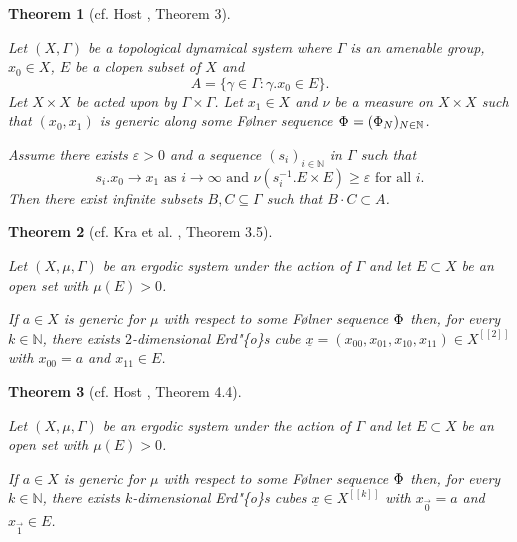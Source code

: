 \documentclass[
  british,
]{article}
\theoremstyle{definition}
\theoremstyle{plain}
\newtheorem{theorem}{Theorem}[section]
\theoremstyle{plain}
\theoremstyle{remark}
\newcommand{\AmenableGroupElement}{{\gamma}}
\newcommand{\Folner}[1][{\vphantom{}}]{{\Phi}_{#1}}
\newcommand{\N}{\mathbb{N}}
\newcommand{\GroupOperation}[2]{{#1}\cdot{#2}}
\newcommand{\AmenableGroup}{{\Gamma}}
\newcommand{\Measure}{{\mu}}
\newcommand{\GroupAction}[2]{{#1}.{#2}}
\begin{document}
\begin{theorem}[cf. Host , Theorem
3]\protect\hypertarget{thm-GenErdosConjDyn}{}\label{thm-GenErdosConjDyn}

Let \((X,\AmenableGroup)\) be a topological dynamical system where
\(\AmenableGroup\) is an amenable group, \(x_0\in X\), \(E\) be a clopen
subset of \(X\) and
\[A=\{\AmenableGroupElement\in\AmenableGroup:\GroupAction{\AmenableGroupElement}{x_0}\in E\}.\]
Let \(X\times X\) be acted upon by
\(\AmenableGroup\times\AmenableGroup\). Let \(x_1\in X\) and \(\nu\) be
a measure on \(X\times X\) such that \((x_0,x_1)\) is generic along some
Følner sequence \(\Folner=(\Folner[N])_{N\in\N}\).

Assume there exists \(\varepsilon>0\) and a sequence \((s_i)_{i\in\N}\)
in \(\AmenableGroup\) such that
\[\GroupAction{s_i}{x_0}\rightarrow x_1\text{ as }i\rightarrow\infty\text{ and }\nu(\GroupAction{s_i^{-1}}{E}\times E)\geq\varepsilon\text{ for all }i. \]
Then there exist infinite subsets \(B,C\subseteq \AmenableGroup\) such
that \(\GroupOperation{B}{C}\subset A\).

\end{theorem}

\begin{theorem}[cf. Kra et al. ,
Theorem
3.5]\protect\hypertarget{thm-GenErdosConjCube}{}\label{thm-GenErdosConjCube}

Let \((X,\Measure,\AmenableGroup)\) be an ergodic system under the
action of \(\AmenableGroup\) and let \(E\subset X\) be an open set with
\(\Measure(E)>0\).

If \(a\in X\) is generic for \(\Measure\) with respect to some Følner
sequence \(\Folner\) then, for every \(k\in\N\), there exists
\(2\)-dimensional Erd"\{o\}s cube
\(\underline{x}=(x_{00},x_{01},x_{10},x_{11})\in X^{[[2]]}\) with
\(x_{00}=a\) and \(x_{11}\in E\).

\end{theorem}

\begin{theorem}[cf. Host , Theorem
4.4]\protect\hypertarget{thm-GenNErdosConjCube}{}\label{thm-GenNErdosConjCube}

Let \((X,\Measure,\AmenableGroup)\) be an ergodic system under the
action of \(\AmenableGroup\) and let \(E\subset X\) be an open set with
\(\Measure(E)>0\).

If \(a\in X\) is generic for \(\Measure\) with respect to some Følner
sequence \(\Folner\) then, for every \(k\in\N\), there exists
\(k\)-dimensional Erd"\{o\}s cubes \(\underline{x}\in X^{[[k]]}\) with
\(x_{\vec{0}}=a\) and \(x_{\vec{1}}\in E\).

\end{theorem}
\end{document}
